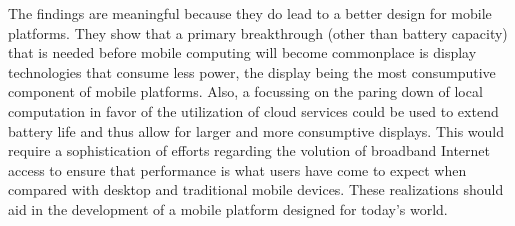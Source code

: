 
The findings are meaningful because they do lead to a better design for mobile
platforms.  They show that a primary breakthrough (other than battery capacity)
that is needed before mobile computing will become commonplace is display
technologies that consume less power, the display being the most consumputive
component of mobile platforms.  Also, a focussing on the paring down of local
computation in favor of the utilization of cloud services could be used to
extend battery life and thus allow for larger and more consumptive displays.
This would require a sophistication of efforts regarding the volution of
broadband Internet access to ensure that performance is what users have come to
expect when compared with desktop and traditional mobile devices.  These
realizations should aid in the development of a mobile platform designed for
today's world.
